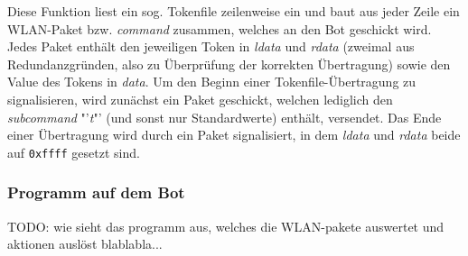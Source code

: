 \begin{itemize}
    Diese Funktion liest ein sog. Tokenfile zeilenweise ein und baut aus jeder Zeile ein WLAN-Paket bzw. \textit{command} zusammen, welches an den Bot geschickt wird. Jedes Paket enthält den jeweiligen Token in \textit{ldata} und \textit{rdata} (zweimal aus Redundanzgründen, also zu Überprüfung der korrekten Übertragung) sowie den Value des Tokens in \textit{data}. Um den Beginn einer Tokenfile-Übertragung zu signalisieren, wird zunächst ein Paket geschickt, welchen lediglich den \textit{subcommand} "'\textit{t}"' (und sonst nur Standardwerte) enthält, versendet. Das Ende einer Übertragung wird durch ein Paket signalisiert, in dem \textit{ldata} und \textit{rdata} beide auf \verb+0xffff+ gesetzt sind.
\end{itemize}


\subsubsection{Programm auf dem Bot}
\label{ctremote_bot}
TODO: wie sieht das programm aus, welches die WLAN-pakete auswertet und aktionen auslöst blablabla...

